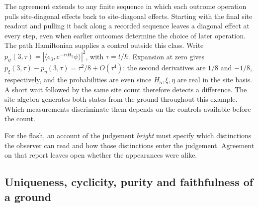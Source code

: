 \documentclass[11pt]{article}
\theoremstyle{definition}
\begin{document}
The agreement extends to any finite sequence in which each outcome operation pulls site-diagonal effects back to site-diagonal effects. Starting with the final site readout and pulling it back along a recorded sequence leaves a diagonal effect at every step, even when earlier outcomes determine the choice of later operation. The path Hamiltonian supplies a control outside this class. Write $p_\psi(3,\tau)=|\langle e_3,e^{-i\tau H_5}\psi\rangle|^2$, with $\tau=t/\hbar$. Expansion at zero gives $p_\xi(3,\tau)-p_\eta(3,\tau)=\tau^2/8+O(\tau^4)$: the second derivatives are $1/8$ and $-1/8$, respectively, and the probabilities are even since $H_5,\xi,\eta$ are real in the site basis. A short wait followed by the same site count therefore detects a difference. The site algebra generates both states from the ground throughout this example. Which measurements discriminate them depends on the controls available before the count.

For the flash, an account of the judgement \emph{bright} must specify which distinctions the observer can read and how those distinctions enter the judgement. Agreement on that report leaves open whether the appearances were alike.

\subsection{Uniqueness, cyclicity, purity and faithfulness of a ground}
\label{subsec:ground-properties}
\end{document}
